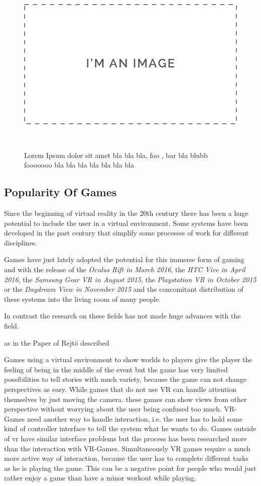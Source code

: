 \begin{figure}
	\centering
	\includegraphics[width=0.9\columnwidth]{./figures/placeholder}
	\caption[blabla]{Lorem Ipsum dolor sit amet bla bla bla, foo , bar bla blubb fooooooo bla bla bla bla bla bla bla}~\label{fig:foobar4}
\end{figure}

\subsection{Popularity Of Games}
Since the beginning of virtual reality in the 20th century there has been a huge potential to include the user in a virtual environment. Some systems have been developed in the past century that simplify some processes of work for different disciplines. 

Games have just lately adopted the potential for this immerse form of gaming and with the release of the \textit{Oculus Rift in March 2016}, the \textit{HTC Vive in April 2016}, the \textit{Samsung Gear VR in August 2015}, the \textit{Playstation VR in October 2015} or the \textit{Daydream View in November 2015} and the concomitant distribution of these systems into the living room of many people.

In contrast the research on these fields has not made huge advances with the field.

as in the Paper of Rejtö described 

Games using a virtual environment to show worlds to players give the player the feeling of being in the middle of the event but the game has very limited possibilities to tell stories with much variety, because the game can not change perspectives as easy. While games that do not use VR can handle attention themselves by just moving the camera. these games can show views from other perspective without worrying about the user being confused too much. VR-Games need another way to handle interaction, i.e. the user has to hold some kind of controller interface to tell the system what he wants to do. Games outside of vr have similar interface problems but the process has been researched more than the interaction with VR-Games. Simultaneously VR games require a much more active way of interaction, because the user has to complete different tasks as he is playing the game. This can be a negative point for people who would just rather enjoy a game than have a minor workout while playing.
			
